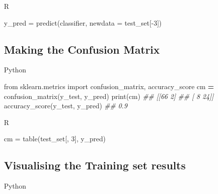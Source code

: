 \documentclass[
]{book}
\newenvironment{Shaded}{\begin{snugshade}}{\end{snugshade}}
\newcommand{\AttributeTok}[1]{\textcolor[rgb]{0.77,0.63,0.00}{#1}}
\newcommand{\BuiltInTok}[1]{#1}
\newcommand{\CommentTok}[1]{\textcolor[rgb]{0.56,0.35,0.01}{\textit{#1}}}
\newcommand{\DecValTok}[1]{\textcolor[rgb]{0.00,0.00,0.81}{#1}}
\newcommand{\FunctionTok}[1]{\textcolor[rgb]{0.00,0.00,0.00}{#1}}
\newcommand{\ImportTok}[1]{#1}
\newcommand{\NormalTok}[1]{#1}
\newcommand{\OperatorTok}[1]{\textcolor[rgb]{0.81,0.36,0.00}{\textbf{#1}}}
\newcommand{\OtherTok}[1]{\textcolor[rgb]{0.56,0.35,0.01}{#1}}
\newcommand{\SpecialCharTok}[1]{\textcolor[rgb]{0.00,0.00,0.00}{#1}}
\theoremstyle{definition}
\theoremstyle{definition}
\theoremstyle{definition}
\theoremstyle{definition}
\theoremstyle{remark}
\begin{document}
R

\begin{Shaded}
\begin{Highlighting}[]
\NormalTok{y\_pred }\OtherTok{=} \FunctionTok{predict}\NormalTok{(classifier, }\AttributeTok{newdata =}\NormalTok{ test\_set[}\SpecialCharTok{{-}}\DecValTok{3}\NormalTok{])}
\end{Highlighting}
\end{Shaded}

\hypertarget{making-the-confusion-matrix-2}{%
\subsection{Making the Confusion Matrix}\label{making-the-confusion-matrix-2}}

Python

\begin{Shaded}
\begin{Highlighting}[]
\ImportTok{from}\NormalTok{ sklearn.metrics }\ImportTok{import}\NormalTok{ confusion\_matrix, accuracy\_score}
\NormalTok{cm }\OperatorTok{=}\NormalTok{ confusion\_matrix(y\_test, y\_pred)}
\BuiltInTok{print}\NormalTok{(cm)}
\CommentTok{\#\# [[66  2]}
\CommentTok{\#\#  [ 8 24]]}
\NormalTok{accuracy\_score(y\_test, y\_pred)}
\CommentTok{\#\# 0.9}
\end{Highlighting}
\end{Shaded}

R

\begin{Shaded}
\begin{Highlighting}[]
\NormalTok{cm }\OtherTok{=} \FunctionTok{table}\NormalTok{(test\_set[, }\DecValTok{3}\NormalTok{], y\_pred)}
\end{Highlighting}
\end{Shaded}

\hypertarget{visualising-the-training-set-results-3}{%
\subsection{Visualising the Training set results}\label{visualising-the-training-set-results-3}}

Python
\end{document}
